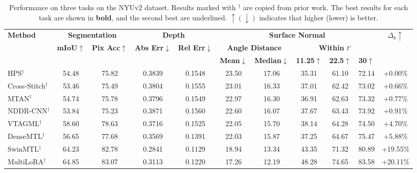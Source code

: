 \documentclass[sigconf]{acmart}
\begin{document}
\begin{table}[!phbt]
\centering

\setlength{\tabcolsep}{6pt}
\renewcommand{\arraystretch}{1}
\caption{Performance on three tasks on the NYUv2 dataset. 
Results marked with $^{\dagger}$ are copied from prior work. The best results for each task are shown in \textbf{bold}, and the second best are underlined.
$\uparrow(\downarrow)$ indicates that higher (lower) is better.}
\vspace{-3pt}
\label{table:nyu}
\begin{tabular}{lcccccccccc}
\toprule
\multirow{3}{*}[-1ex]{\textbf{Method}}
& \multicolumn{2}{c}{\textbf{Segmentation}}
& \multicolumn{2}{c}{\textbf{Depth}}
& \multicolumn{5}{c}{\textbf{Surface Normal}}
& \multirow{3}{*}[-1ex]{$\Delta_b \uparrow$} \\
\cmidrule(lr){2-3}\cmidrule(lr){4-5}\cmidrule(lr){6-10}
& \multirow{2}{*}[-0.4ex]{\textbf{mIoU}$\uparrow$}
& \multirow{2}{*}[-0.4ex]{\textbf{Pix Acc}$\uparrow$}
& \multirow{2}{*}[-0.4ex]{\textbf{Abs Err}$\downarrow$}
& \multirow{2}{*}[-0.4ex]{\textbf{Rel Err}$\downarrow$}
& \multicolumn{2}{c}{\textbf{Angle Distance}}
& \multicolumn{3}{c}{\textbf{Within $t^\circ$}}
& \\
\cmidrule(lr){6-7}\cmidrule(lr){8-10}
& & & & 
& \textbf{Mean}$\downarrow$
& \textbf{Median}$\downarrow$
& \textbf{11.25}$\uparrow$
& \textbf{22.5}$\uparrow$
& \textbf{30}$\uparrow$
& \\
\midrule
HPS$^{\dagger}$          & 54.48 & 75.82 & 0.3839 & 0.1548 & 23.50 & 17.06 & 35.31 & 61.10 & 72.14 & +0.00\% \\
Cross-Stitch$^{\dagger}$ & 53.46 & 75.49 & 0.3804 & 0.1555 & 23.01 & 16.33 & 37.01 & 62.42 & 73.02 & +0.66\% \\
MTAN$^{\dagger}$         & 54.74 & 75.78 & 0.3796 & 0.1549 & 22.97 & 16.30 & 36.91 & 62.63 & 73.32 & +0.77\% \\
NDDR-CNN$^{\dagger}$     & 53.84 & 75.23 & 0.3871 & 0.1560 & 22.60 & 16.07 & 37.67 & 63.43 & 73.92 & +0.91\% \\
VTAGML$^{\dagger}$       & 58.60 & 78.63 & 0.3716 & 0.1525 & 22.05 & 15.70 & 38.14 & 64.28 & 74.50 & +4.70\% \\
DenseMTL$^{\dagger}$     & 56.65 & 77.68 & 0.3569 & 0.1391 & 22.03 & 15.87 & 37.25 & 64.67 & 75.47 & +5.88\% \\
SwinMTL$^{\dagger}$      & 64.23 & 82.78 & 0.2841 & 0.1129 & 18.94 & 13.34 & 43.35 & 71.32 & 80.89 & +19.55\% \\
MultiLoRA$^{\dagger}$        & 64.85 & 83.07 & 0.3113 & 0.1220 & 17.26 & 12.19 & 48.28 & 74.65 & 83.58 & +20.11\% \\

\end{tabular}
\end{table}
\end{document}
